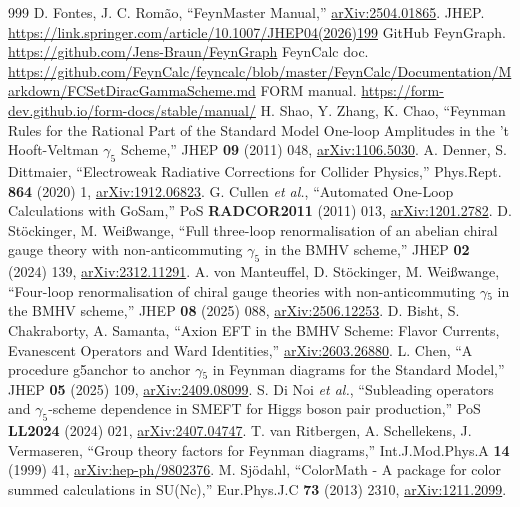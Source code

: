 \documentclass[a4paper,10pt]{ltjsarticle}
\begin{document}
\begin{thebibliography}{999}
 D. Fontes, J. C. Romão, ``FeynMaster Manual,'' \href{https://arxiv.org/abs/2504.01865}{arXiv:2504.01865}.
 JHEP. \url{https://link.springer.com/article/10.1007/JHEP04(2026)199}
 GitHub FeynGraph. \url{https://github.com/Jens-Braun/FeynGraph}
 FeynCalc doc. \url{https://github.com/FeynCalc/feyncalc/blob/master/FeynCalc/Documentation/Markdown/FCSetDiracGammaScheme.md}
 FORM manual. \url{https://form-dev.github.io/form-docs/stable/manual/}
 H. Shao, Y. Zhang, K. Chao, ``Feynman Rules for the Rational Part of the Standard Model One-loop Amplitudes in the 't Hooft-Veltman $\gamma_5$ Scheme,'' JHEP \textbf{09} (2011) 048, \href{https://arxiv.org/abs/1106.5030}{arXiv:1106.5030}.
 A. Denner, S. Dittmaier, ``Electroweak Radiative Corrections for Collider Physics,'' Phys.Rept. \textbf{864} (2020) 1, \href{https://arxiv.org/abs/1912.06823}{arXiv:1912.06823}.
 G. Cullen \textit{et al.}, ``Automated One-Loop Calculations with GoSam,'' PoS \textbf{RADCOR2011} (2011) 013, \href{https://arxiv.org/abs/1201.2782}{arXiv:1201.2782}.
 D. Stöckinger, M. Weißwange, ``Full three-loop renormalisation of an abelian chiral gauge theory with non-anticommuting $\gamma_{5}$ in the BMHV scheme,'' JHEP \textbf{02} (2024) 139, \href{https://arxiv.org/abs/2312.11291}{arXiv:2312.11291}.
 A. von Manteuffel, D. Stöckinger, M. Weißwange, ``Four-loop renormalisation of chiral gauge theories with non-anticommuting $\gamma$$_{5}$ in the BMHV scheme,'' JHEP \textbf{08} (2025) 088, \href{https://arxiv.org/abs/2506.12253}{arXiv:2506.12253}.
 D. Bisht, S. Chakraborty, A. Samanta, ``Axion EFT in the BMHV Scheme: Flavor Currents, Evanescent Operators and Ward Identities,'' \href{https://arxiv.org/abs/2603.26880}{arXiv:2603.26880}.
 L. Chen, ``A procedure g5anchor to anchor $\gamma$$_{5}$ in Feynman diagrams for the Standard Model,'' JHEP \textbf{05} (2025) 109, \href{https://arxiv.org/abs/2409.08099}{arXiv:2409.08099}.
 S. Di Noi \textit{et al.}, ``Subleading operators and $\gamma_5$-scheme dependence in SMEFT for Higgs boson pair production,'' PoS \textbf{LL2024} (2024) 021, \href{https://arxiv.org/abs/2407.04747}{arXiv:2407.04747}.
 T. van Ritbergen, A. Schellekens, J. Vermaseren, ``Group theory factors for Feynman diagrams,'' Int.J.Mod.Phys.A \textbf{14} (1999) 41, \href{https://arxiv.org/abs/hep-ph/9802376}{arXiv:hep-ph/9802376}.
 M. Sjödahl, ``ColorMath - A package for color summed calculations in SU(Nc),'' Eur.Phys.J.C \textbf{73} (2013) 2310, \href{https://arxiv.org/abs/1211.2099}{arXiv:1211.2099}.

\end{thebibliography}
\end{document}
